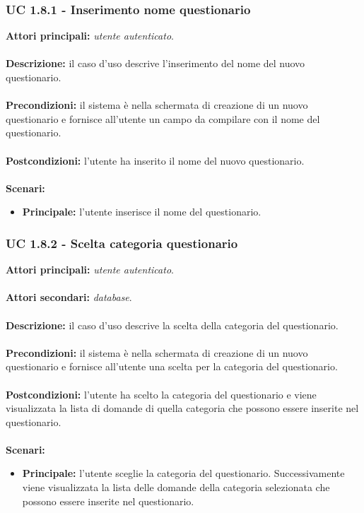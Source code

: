 \documentclass[a4paper,11pt]{article}
\begin{document}
\subsubsection{UC 1.8.1 - Inserimento nome questionario}

\textbf{Attori principali:} \textit{utente autenticato}.\\
\\
\textbf{Descrizione:} il caso d'uso descrive l'inserimento del nome del nuovo questionario. \\
\\
\textbf{Precondizioni:} il sistema è nella schermata di creazione di un nuovo questionario e fornisce all'utente un campo da compilare con il nome del questionario.\\
\\
\textbf{Postcondizioni:} l'utente ha inserito il nome del nuovo questionario. \\
\\
\textbf{Scenari:}
\begin{itemize}
\item \textbf{Principale:} l'utente inserisce il nome del questionario.
\end{itemize}
\vspace{6 mm}
\subsubsection{UC 1.8.2 - Scelta categoria questionario}

\textbf{Attori principali:} \textit{utente autenticato}.\\
\\
\textbf{Attori secondari:} \textit{database}.\\
\\
\textbf{Descrizione:} il caso d'uso descrive la scelta della categoria del questionario. \\
\\
\textbf{Precondizioni:} il sistema è nella schermata di creazione di un nuovo questionario e fornisce all'utente una scelta per la categoria del questionario.\\
\\
\textbf{Postcondizioni:} l'utente ha scelto la categoria del questionario e viene visualizzata la lista di domande di quella categoria che possono essere inserite nel questionario. \\
\\
\textbf{Scenari:}
\begin{itemize}
\item \textbf{Principale:} l'utente sceglie la categoria del questionario. Successivamente viene visualizzata la lista delle domande della categoria selezionata che possono essere inserite nel questionario.
\end{itemize}
\vspace{6 mm}
\end{document}
